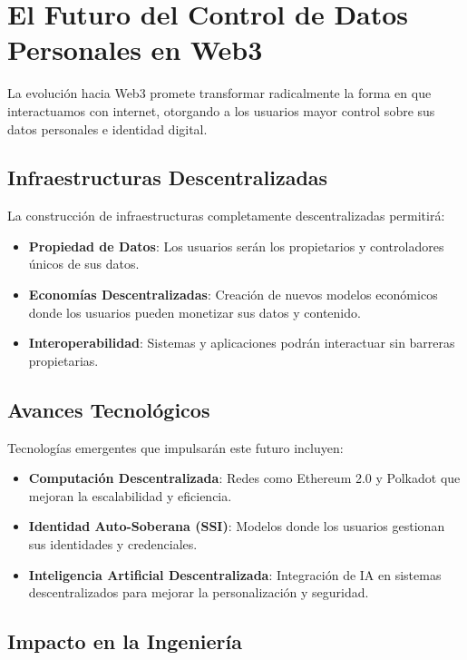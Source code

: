 \section{El Futuro del Control de Datos Personales en Web3}

La evolución hacia Web3 promete transformar radicalmente la forma en que interactuamos con internet, otorgando a los usuarios mayor control sobre sus datos personales e identidad digital.

\subsection{Infraestructuras Descentralizadas}

La construcción de infraestructuras completamente descentralizadas permitirá:

\begin{itemize}
    \item \textbf{Propiedad de Datos}: Los usuarios serán los propietarios y controladores únicos de sus datos.
    \item \textbf{Economías Descentralizadas}: Creación de nuevos modelos económicos donde los usuarios pueden monetizar sus datos y contenido.
    \item \textbf{Interoperabilidad}: Sistemas y aplicaciones podrán interactuar sin barreras propietarias.
\end{itemize}

\subsection{Avances Tecnológicos}

Tecnologías emergentes que impulsarán este futuro incluyen:

\begin{itemize}
    \item \textbf{Computación Descentralizada}: Redes como Ethereum 2.0 y Polkadot que mejoran la escalabilidad y eficiencia.
    \item \textbf{Identidad Auto-Soberana (SSI)}: Modelos donde los usuarios gestionan sus identidades y credenciales.
    \item \textbf{Inteligencia Artificial Descentralizada}: Integración de IA en sistemas descentralizados para mejorar la personalización y seguridad.
\end{itemize}

\subsection{Impacto en la Ingeniería}

